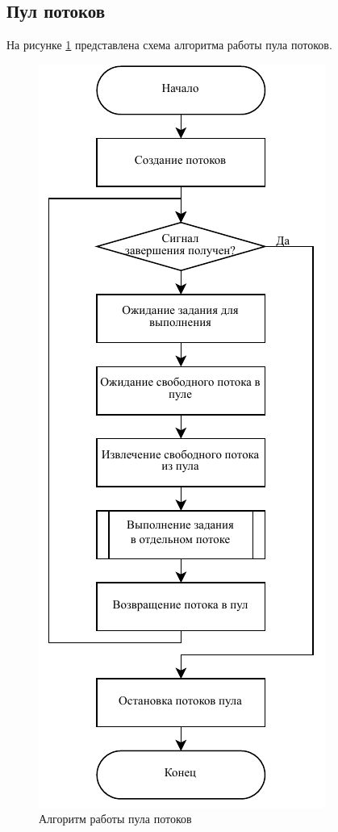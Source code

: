 \newpage

\subsection{Пул потоков}

На рисунке \ref{fig:pool} представлена схема алгоритма работы пула потоков.

\begin{figure}[hbtp]
	\centering
	\includegraphics[scale=1.2]{img/thpool.pdf}
	\caption{Алгоритм работы пула потоков}
	\label{fig:pool}
\end{figure}

\pagebreak